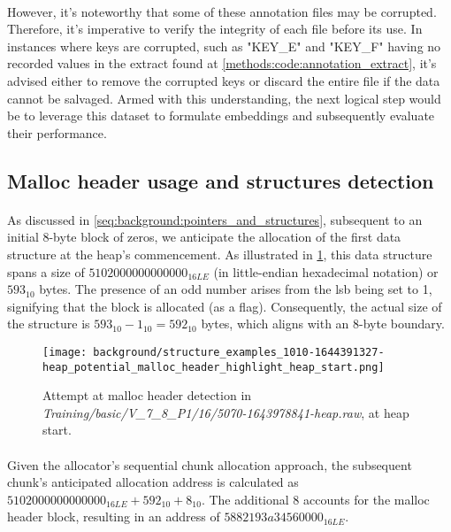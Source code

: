             \paragraph{}However, it's noteworthy that some of these annotation files may be corrupted. Therefore, it's imperative to verify the integrity of each file before its use. In instances where keys are corrupted, such as "KEY\_E" and "KEY\_F" having no recorded values in the extract found at \ref{methods:code:annotation_extract}, it's advised either to remove the corrupted keys or discard the entire file if the data cannot be salvaged. Armed with this understanding, the next logical step would be to leverage this dataset to formulate embeddings and subsequently evaluate their performance.

        \subsection{Malloc header usage and structures detection}
            \paragraph{}As discussed in \ref{seq:background:pointers_and_structures}, subsequent to an initial 8-byte block of zeros, we anticipate the allocation of the first data structure at the heap's commencement. As illustrated in \ref{fig:methods:malloc_header_detection_heap_start}, this data structure spans a size of $ 5102000000000000_{16LE} $ (in little-endian hexadecimal notation) or $ 593_{10} $ bytes. The presence of an odd number arises from the \acrshort{lsb} being set to 1, signifying that the block is allocated (as a flag). Consequently, the actual size of the structure is $ 593_{10} - 1_{10} = 592_{10} $ bytes, which aligns with an 8-byte boundary.

            \begin{figure}[H]
                \centering
                \texttt{[image: background/structure\_examples\_1010-1644391327-heap\_potential\_malloc\_header\_highlight\_heap\_start.png]}
                \caption{Attempt at malloc header detection in \textit{Training/basic/V\_7\_8\_P1/16/5070-1643978841-heap.raw}, at heap start.}
                \label{fig:methods:malloc_header_detection_heap_start}
            \end{figure}

            \paragraph{}Given the allocator's sequential chunk allocation approach, the subsequent chunk's anticipated allocation address is calculated as $ 5102000000000000_{16LE} + 592_{10} + 8_{10} $. The additional 8 accounts for the malloc header block, resulting in an address of $ 5882193a34560000_{16LE} $.
        

